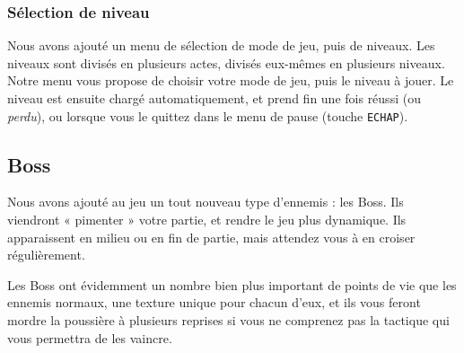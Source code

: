\documentclass[12pt,a4paper]{article}
\begin{document}
		\subsubsection{Sélection de niveau}
		\par
		Nous avons ajouté un menu de sélection de mode de jeu, puis de niveaux. Les niveaux sont divisés en plusieurs actes, divisés eux-mêmes en plusieurs niveaux.
		Notre menu vous propose de choisir votre mode de jeu, puis le niveau à jouer.
		Le niveau est ensuite chargé automatiquement, et prend fin une fois réussi (ou \emph{perdu}), ou lorsque vous le quittez dans le menu de pause (touche \texttt{ECHAP}).
		
		\subsection{Boss}
		\par
		Nous avons ajouté au jeu un tout nouveau type d'ennemis : les Boss.
		Ils viendront « pimenter » votre partie, et rendre le jeu plus dynamique.
		Ils apparaissent en milieu ou en fin de partie, mais attendez vous à en croiser régulièrement.
		\par
		Les Boss ont évidemment un nombre bien plus important de points de vie que les ennemis normaux, une texture unique pour chacun d'eux, et ils vous feront mordre la poussière à plusieurs reprises si vous ne comprenez pas la tactique qui vous permettra de les vaincre.
		
\end{document}
